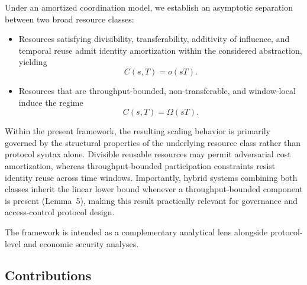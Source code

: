 \documentclass[journal]{IEEEtran}
\begin{document}
	Under an amortized coordination model,
	we establish an asymptotic separation between two broad
	resource classes:
	
	\begin{itemize}
		
		\item Resources satisfying divisibility,
		transferability, additivity of influence,
		and temporal reuse admit identity amortization
		within the considered abstraction,
		yielding
		\[
		C(s,T)=o(sT).
		\]
		
		\item Resources that are throughput-bounded,
		non-transferable, and window-local induce the regime
		\[
		C(s,T)=\Omega(sT).
		\]
		
	\end{itemize}
	
	Within the present framework, the resulting scaling behavior
	is primarily governed by the structural properties of the
	underlying resource class rather than protocol syntax alone.
	Divisible reusable resources may permit adversarial cost
	amortization, whereas throughput-bounded participation
	constraints resist identity reuse across time windows.
	Importantly, hybrid systems combining both classes inherit
	the linear lower bound whenever a throughput-bounded component
	is present (Lemma~5), making this result practically relevant
	for governance and access-control protocol design.
	
	The framework is intended as a complementary analytical lens
	alongside protocol-level and economic security analyses.
	
	\subsection{Contributions}
	
\end{document}
